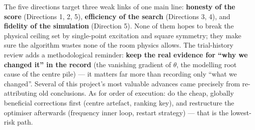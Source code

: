 \documentclass[11pt,a4paper]{article}
\begin{document}
The five directions target three weak links of one main line: \textbf{honesty of the score} (Directions 1, 2, 5), \textbf{efficiency of the search} (Directions 3, 4), and \textbf{fidelity of the simulation} (Direction 5). None of them hopes to break the physical ceiling set by single-point excitation and square symmetry; they make sure the algorithm wastes none of the room physics allows. The trial-history review adds a methodological reminder: \textbf{keep the real evidence for ``why we changed it'' in the record} (the vanishing gradient of $\theta$, the modelling root cause of the centre pile) --- it matters far more than recording only ``what we changed''. Several of this project's most valuable advances came precisely from re-attributing old conclusions. As for order of execution: do the cheap, globally beneficial corrections first (centre artefact, ranking key), and restructure the optimiser afterwards (frequency inner loop, restart strategy) --- that is the lowest-risk path.
\end{document}
